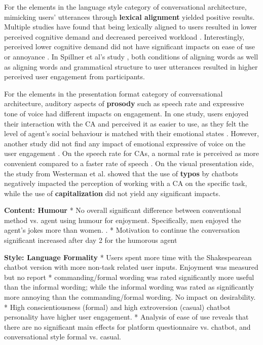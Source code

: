For the elements in the language style category of conversational architecture, mimicking users' utterances through \textbf{lexical alignment} yielded positive results. Multiple studies have found that being lexically aligned to users resulted in lower perceived cognitive demand and decreased perceived workload \cite{huiyang2022improving}\cmt{[17]}\cite{linnemann2018can}\cmt{[15]}\cite{spillner2021talk}\cmt{[18]}. Interestingly, perceived lower cognitive demand did not have significant impacts on ease of use \cite{linnemann2018can}\cmt{[15]} or annoyance \cite{huiyang2022improving}\cmt{[17]}. In Spillner et al's study \cite{spillner2021talk}\cmt{[18]}, both conditions of aligning words as well as aligning words and grammatical structure to user utterances resulted in higher perceived user engagement from participants. 

For the elements in the presentation format category of conversational architecture, auditory aspects of \textbf{prosody} such as speech rate and expressive tone of voice had different impacts on engagement. In one study, users enjoyed their interaction with the CA and perceived it as easier to use, as they felt the level of agent's social behaviour is matched with their emotional states \cite{kim2020can}\cmt{[24]}. However, another study did not find any impact of emotional expressive of voice on the user engagement \cite{zhu2022effects}\cmt{[26]}. On the speech rate for CAs, a normal rate is perceived as more convenient compared to a faster rate of speech \cite{choi2020nobody}\cmt{[54]}. On the visual presentation side, the study from Westerman et al. \cite{westerman2019believe}\cmt{[9]} showed that the use of \textbf{typos} by chatbots negatively impacted the perception of working with a CA on the specific task, while the use of \textbf{capitalization} did not yield any significant impacts.

\textbf{Content: Humour}
* No overall significant difference between conventional method vs. agent using humour for enjoyment. Specifically, men enjoyed the agent's jokes more than women.  \cite{miyamoto2017improving}\cmt{[46]}.
* Motivation to continue the conversation significant increased after day 2 for the humorous agent \cite{go2021conversational}\cmt{[80]}

\textbf{Style: Language Formality}
* Users spent more time with the Shakespearean chatbot version with more non-task related user inputs. Enjoyment was measured but no report \cite{elsholz2019exploring}\cmt{[61]}
* commanding/formal wording was rated significantly more useful than the informal wording; while the informal wording was rated as significantly more annoying than the commanding/formal wording. No impact on desirability. \cite{jestin2022effects}\cmt{[81]}
* High conscientiousness (formal) and high extroversion (casual) chatbot personality have higher user engagement. \cite{moilanen2022measuring}\cmt{[82]}
* Analysis of ease of use reveals that there are no significant main effects for platform questionnaire vs. chatbot, and conversational style formal vs. casual.\cite{kim2019comparing}\cmt{[89]}

